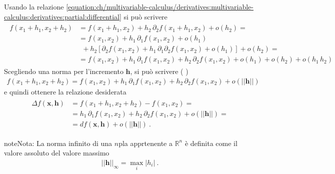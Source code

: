 \documentclass[letterpaper,10pt,italian]{jupyterBook}
\begin{document}
\sphinxAtStartPar
Usando la relazione \eqref{equation:ch/multivariable-calculus/derivatives:multivariable-calculus:derivatives:partial:differential} si può scrivere
\begin{equation*}
\begin{split}\begin{aligned}
f(x_1 + h_1, x_2 + h_2)
  & = f(x_1 + h_1, x_2 ) + h_2 \, \partial_{2} f(x_1 + h_1, x_2) + o(h_2) = \\
  & = f(x_1, x_2) + h_1 \, \partial_{1} f(x_1, x_2) + o(h_1) \\
  & \ \ + h_2 \left[ \partial_{2} f(x_1, x_2) + h_1 \, \partial_{1}\partial_{2} f(x_1, x_2) + o (h_1) \right] + o(h_2) = \\
  & = f(x_1, x_2) + h_1 \, \partial_{1} f(x_1, x_2) + h_2 \, \partial_{2} f(x_1, x_2) + o(h_1) + o(h_2) + o(h_1 \, h_2) 
\end{aligned}\end{split}
\end{equation*}
\sphinxAtStartPar
Scegliendo una norma per l’incremento \(\mathbf{h}\), si può scrivere ( )
\begin{equation*}
\begin{split}
f(x_1 + h_1, x_2 + h_2) = f(x_1, x_2) + h_1 \, \partial_{1} f(x_1, x_2) + h_2 \, \partial_{2} f(x_1, x_2) + o(||\mathbf{h}||)
\end{split}
\end{equation*}
\sphinxAtStartPar
e quindi ottenere la relazione desiderata
\begin{equation*}
\begin{split}\begin{aligned}
\Delta f(\mathbf{x}, \mathbf{h}) & = f(x_1 + h_1, x_2 + h_2) - f(x_1, x_2) = \\
                                 & = h_1 \, \partial_{1} f(x_1, x_2) + h_2 \, \partial_{2} f(x_1, x_2) + o(||\mathbf{h}||) = \\
                                 & = d f(\mathbf{x}, \mathbf{h}) + o(||\mathbf{h}||) \ .
\end{aligned}\end{split}
\end{equation*}
\begin{sphinxadmonition}{note}{Nota:}
\sphinxAtStartPar
{}
La norma infinito di una \(n\)\sphinxhyphen{}pla apprtenente a \(\mathbb{R}^n\) è definita come il valore assoluto del valore massimo
\begin{equation*}
\begin{split}||\mathbf{h}||_{\infty} = \max_i |h_i| \ .\end{split}
\end{equation*}\end{sphinxadmonition}
\end{document}
